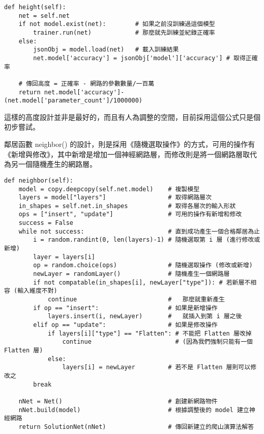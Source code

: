 \documentclass{article}
\begin{document}
\begin{minipage}{\linewidth}
\begin{lstlisting}
def height(self):
    net = self.net
    if not model.exist(net):        # 如果之前沒訓練過這個模型
        trainer.run(net)            # 那麼就先訓練並紀錄正確率
    else:
        jsonObj = model.load(net)   # 載入訓練結果
        net.model['accuracy'] = jsonObj['model']['accuracy'] # 取得正確率

    # 傳回高度 = 正確率 - 網路的參數數量/一百萬
    return net.model['accuracy']-(net.model['parameter_count']/1000000)
\end{lstlisting}
\end{minipage}

這樣的高度設計並非是最好的，而且有人為調整的空間，目前採用這個公式只是個初步嘗試。

鄰居函數 neighbor() 的設計，則是採用《隨機選取操作》的方式，可用的操作有《新增與修改》，其中新增是增加一個神經網路層，而修改則是將一個網路層取代為另一個隨機產生的網路層。

\begin{minipage}{\linewidth}
\begin{lstlisting}
def neighbor(self):
    model = copy.deepcopy(self.net.model)    # 複製模型
    layers = model["layers"]                 # 取得網路層次
    in_shapes = self.net.in_shapes           # 取得各層次的輸入形狀
    ops = ["insert", "update"]               # 可用的操作有新增和修改
    success = False
    while not success:                       # 直到成功產生一個合格鄰居為止
        i = random.randint(0, len(layers)-1) # 隨機選取第 i 層 (進行修改或新增)
        layer = layers[i]
        op = random.choice(ops)              # 隨機選取操作 (修改或新增)
        newLayer = randomLayer()             # 隨機產生一個網路層
        if not compatable(in_shapes[i], newLayer["type"]): # 若新層不相容 (輸入維度不對)
            continue                         #   那麼就重新產生
        if op == "insert":                   # 如果是新增操作
            layers.insert(i, newLayer)       #   就插入到第 i 層之後
        elif op == "update":                 # 如果是修改操作
            if layers[i]["type"] == "Flatten": # 不能把 Flatten 層改掉
                continue                       # (因為我們強制只能有一個 Flatten 層)
            else:
                layers[i] = newLayer         # 若不是 Flatten 層則可以修改之
        break

    nNet = Net()                             # 創建新網路物件
    nNet.build(model)                        # 根據調整後的 model 建立神經網路
    return SolutionNet(nNet)                 # 傳回新建立的爬山演算法解答
\end{lstlisting}
\end{minipage}
\end{document}
